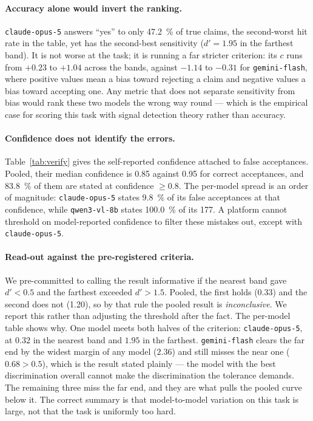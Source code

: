 \documentclass[10pt,a4paper]{article}
\begin{document}
\paragraph{Accuracy alone would invert the ranking.} \texttt{claude-opus-5}
answers ``yes'' to only \SI{47.2}{\percent} of true claims, the second-worst hit
rate in the table, yet has the second-best sensitivity ($d'=\num{1.95}$ in the
farthest band). It is not worse at the task; it is running a far stricter
criterion: its $c$ runs from $+0.23$ to $+1.04$ across the bands, against
$-1.14$ to $-0.31$ for \texttt{gemini-flash}, where positive values mean a bias
toward rejecting a claim and negative values a bias toward accepting one. Any metric that does not separate sensitivity from bias
would rank these two models the wrong way round --- which is the empirical case
for scoring this task with signal detection theory rather than accuracy.

\paragraph{Confidence does not identify the errors.} Table~\ref{tab:verify}
gives the self-reported confidence attached to false acceptances. Pooled, their
median confidence is \num{0.85} against \num{0.95} for correct acceptances, and
\SI{83.8}{\percent} of them are stated at confidence $\geq \num{0.8}$. The
per-model spread is an order of magnitude: \texttt{claude-opus-5} states
\SI{9.8}{\percent} of its false acceptances at that confidence, while
\texttt{qwen3-vl-8b} states \SI{100.0}{\percent} of its \num{177}. A platform
cannot threshold on model-reported confidence to filter these mistakes out,
except with \texttt{claude-opus-5}.
\paragraph{Read-out against the pre-registered criteria.} We pre-committed to
calling the result informative if the nearest band gave $d' < \num{0.5}$ and the
farthest exceeded $d' > \num{1.5}$. Pooled, the first holds (\num{0.33}) and the
second does not (\num{1.20}), so by that rule the pooled result is
\emph{inconclusive}. We report this rather than adjusting the threshold after
the fact. The per-model table shows why. One model meets both halves of the
criterion: \texttt{claude-opus-5}, at $0.32$ in the nearest band and $1.95$ in
the farthest. \texttt{gemini-flash} clears the far end by the widest margin of
any model ($2.36$) and still misses the near one ($0.68 > 0.5$), which is the
result stated plainly --- the model with the best discrimination overall cannot
make the discrimination the tolerance demands. The remaining three miss the far
end, and they are what pulls the pooled curve below it. The correct summary is that model-to-model
variation on this task is large, not that the task is uniformly too hard.
\end{document}
